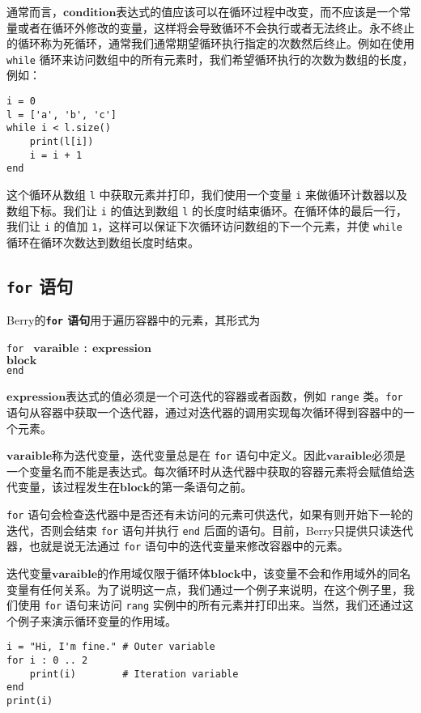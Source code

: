 通常而言，$\bm{condition}$表达式的值应该可以在循环过程中改变，而不应该是一个常量或者在循环外修改的变量，这样将会导致循环不会执行或者无法终止。永不终止的循环称为死循环，通常我们通常期望循环执行指定的次数然后终止。例如在使用 \texttt{while} 循环来访问数组中的所有元素时，我们希望循环执行的次数为数组的长度，例如：
\begin{lstlisting}[language=berry, numbers=none]
i = 0
l = ['a', 'b', 'c']
while i < l.size()
    print(l[i])
    i = i + 1
end
\end{lstlisting}
这个循环从数组 \texttt{l} 中获取元素并打印，我们使用一个变量 \texttt{i} 来做循环计数器以及数组下标。我们让 \texttt{i} 的值达到数组 \texttt{l} 的长度时结束循环。在循环体的最后一行，我们让 \texttt{i} 的值加 \texttt{1}，这样可以保证下次循环访问数组的下一个元素，并使 \texttt{while} 循环在循环次数达到数组长度时结束。

\subsection{\texttt{for} 语句}

Berry的\textbf{\texttt{for} 语句}用于遍历容器中的元素，其形式为
\begin{algorithm}
    \texttt{for } $\bm{varaible}$ \texttt{:} $\bm{expression}$ \\
        \qquad $\bm{block}$ \\
    \texttt{end}
\end{algorithm}\vspace{-0.6em}

$\bm{expression}$表达式的值必须是一个可迭代的容器或者函数，例如 \texttt{range} 类。\texttt{for} 语句从容器中获取一个迭代器，通过对迭代器的调用实现每次循环得到容器中的一个元素。

$\bm{varaible}$称为迭代变量，迭代变量总是在 \texttt{for} 语句中定义。因此$\bm{varaible}$必须是一个变量名而不能是表达式。每次循环时从迭代器中获取的容器元素将会赋值给迭代变量，该过程发生在$\bm{block}$的第一条语句之前。

\texttt{for} 语句会检查迭代器中是否还有未访问的元素可供迭代，如果有则开始下一轮的迭代，否则会结束 \texttt{for} 语句并执行 \texttt{end} 后面的语句。目前，Berry只提供只读迭代器，也就是说无法通过 \texttt{for} 语句中的迭代变量来修改容器中的元素。

迭代变量$\bm{varaible}$的作用域仅限于循环体$\bm{block}$中，该变量不会和作用域外的同名变量有任何关系。为了说明这一点，我们通过一个例子来说明，在这个例子里，我们使用 \texttt{for} 语句来访问 \texttt{rang} 实例中的所有元素并打印出来。当然，我们还通过这个例子来演示循环变量的作用域。
\begin{lstlisting}[language=berry]
i = "Hi, I'm fine." # Outer variable
for i : 0 .. 2
    print(i)        # Iteration variable
end
print(i)
\end{lstlisting}

